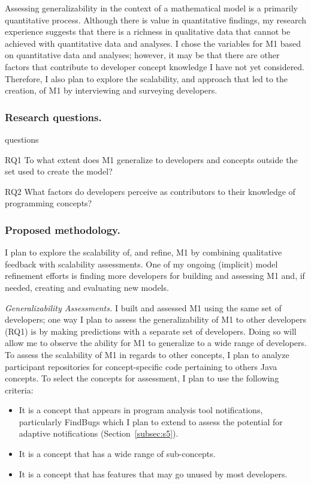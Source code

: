 \documentclass{llncs}
\begin{document}
Assessing generalizability in the context of a mathematical model is a primarily quantitative process. Although there is value in quantitative findings, my research experience suggests that there is a richness in qualitative data that cannot be achieved with quantitative data and analyses. I chose the variables for M1 based on quantitative data and analyses; however, it may be that there are other factors that contribute to developer concept knowledge I have not yet considered. Therefore, I also plan to explore the scalability, and approach that led to the creation, of M1 by interviewing and surveying developers. 

\subsubsection{Research questions.}

\begin{labeling}{questions}
	\item [RQ1] To what extent does M1 generalize to developers and concepts outside the set used to create the model?
	\item [RQ2] What factors do developers perceive as contributors to their knowledge of programming concepts?
\end{labeling}

\subsubsection{Proposed methodology.}
I plan to explore the scalability of, and refine, M1 by combining qualitative feedback with scalability assessments. One of my ongoing (implicit) model refinement efforts is finding more developers for building and assessing M1 and, if needed, creating and evaluating new models.

\vspace{0.5em}
\noindent\textit{Generalizability Assessments.}
I built and assessed M1 using the same set of developers; one way I plan to assess the generalizability of M1 to other developers (RQ1) is by making predictions with a separate set of developers. Doing so will allow me to observe the ability for M1 to generalize to a wide range of developers. 
To assess the scalability of M1 in regards to other concepts, I plan to analyze participant repositories for concept-specific code pertaining to others Java concepts.
To select the concepts for assessment, I plan to use the following criteria:
\begin{itemize}
	\item It is a concept that appears in program analysis tool notifications, particularly FindBugs which I plan to extend to assess the potential for adaptive notifications (Section~\ref{subsec:s5}).
	\item It is a concept that has a wide range of sub-concepts.
	\item It is a concept that has features that may go unused by most developers.
\end{itemize}
\end{document}
